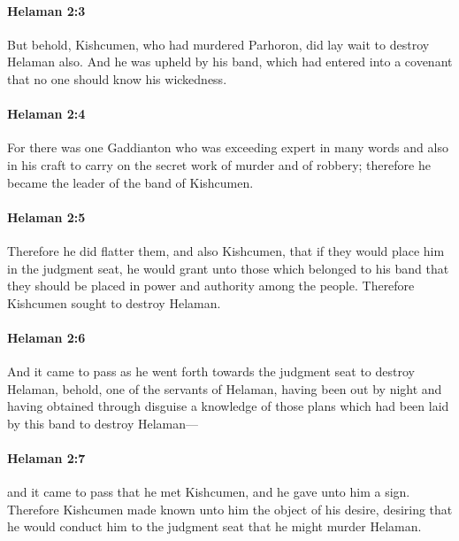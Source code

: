 		\paragraph{Helaman 2:3} %
			\label{HELAMAN-2-3}

			But behold, Kishcumen, who had murdered Parhoron,
			did lay wait to destroy Helaman also.
			And he was upheld by his band,
			which had entered into a covenant
			that no one should know his wickedness.

		\paragraph{Helaman 2:4} %
			\label{HELAMAN-2-4}

			For there was one Gaddianton who was exceeding expert
			in many words and also in his craft
			to carry on the secret work of murder and of robbery;
			therefore he became the leader of the band of Kishcumen.

		\paragraph{Helaman 2:5} %
			\label{HELAMAN-2-5}

			Therefore he did flatter them, and also Kishcumen,
			that if they would place him in the judgment seat,
			he would grant unto those which belonged to his band
			that they should be placed in power and authority among the people.
			Therefore Kishcumen sought to destroy Helaman.

		\paragraph{Helaman 2:6} %
			\label{HELAMAN-2-6}

			And it came to pass as he went forth
			towards the judgment seat to destroy Helaman,
			behold, one of the servants of Helaman,
			having been out by night
			and having obtained through disguise a knowledge of those plans
			which had been laid by this band to destroy Helaman---

		\paragraph{Helaman 2:7} %
			\label{HELAMAN-2-7}

			and it came to pass that he met Kishcumen,
			and he gave unto him a sign.
			Therefore Kishcumen made known unto him the object of his desire,
			desiring that he would conduct him to the judgment seat
			that he might murder Helaman.

